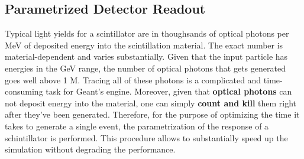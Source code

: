 \subsection{Parametrized Detector Readout}
Typical light yields for a scintillator are in thoughsands of optical photons per MeV of deposited energy into the scintillation material. The exact number is material-dependent and varies substantially. Given that the input particle has energies in the GeV range, the number of optical photons that gets generated goes well above 1 M. Tracing all of these photons is a complicated and time-consuming task for Geant's engine. Moreover, given that \textbf{optical photons} can not deposit energy into the material, one can simply \textbf{count and kill} them right after they've been generated. Therefore, for the purpose of optimizing the time it takes to generate a single event, the parametrization of the response of a schintillator is performed. This procedure allows to substantially speed up the simulation without degrading the performance.

